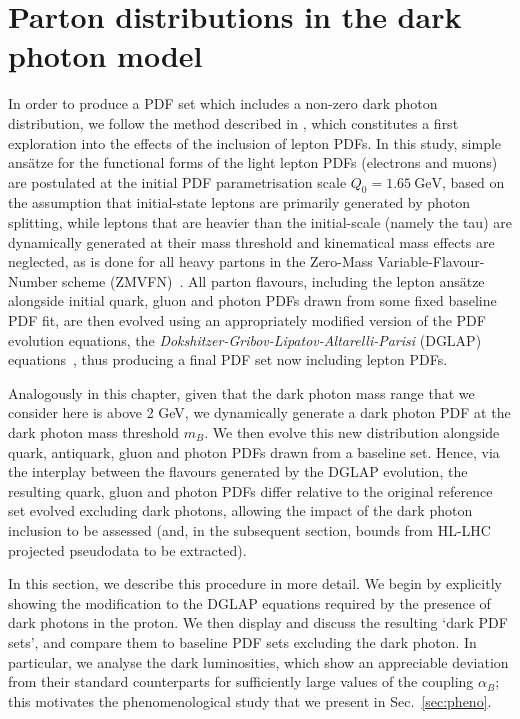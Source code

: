 \documentclass[withindex,glossary]{cam-thesis}
\begin{document}
\section{Parton distributions in the dark photon model}
\label{sec:dark_pdfs}
In order to produce a PDF set which includes a non-zero dark photon distribution,
we follow the method described in \cite{Bertone:2015lqa},
which constitutes a first exploration into the effects of the inclusion of lepton PDFs.
In this study, 
simple ans\"{a}tze for the functional forms of the light lepton PDFs (electrons and muons)
are postulated at the initial PDF parametrisation scale $Q_0 = 1.65\ \text{GeV}$, based on the assumption that
initial-state leptons are primarily generated by photon splitting, 
while leptons that are heavier than the initial-scale (namely the
tau) are dynamically generated at their mass threshold and
kinematical mass effects are neglected, as is done for all heavy
partons in the Zero-Mass Variable-Flavour-Number scheme (ZMVFN)~\cite{Maltoni:2012pa,Bertone:2017djs}.  
%
All parton flavours, including the lepton ans\"{a}tze alongside initial quark,
gluon and photon PDFs drawn from some fixed baseline PDF fit, are then
evolved using an appropriately modified version of the PDF evolution equations,
the \textit{Dokshitzer-Gribov-Lipatov-Altarelli-Parisi} (DGLAP)
equations~\cite{Altarelli:1977zs,Gribov:1972ri,Dokshitzer:1977sg}, thus producing
a final PDF set now including lepton PDFs. 

Analogously in this chapter, given that the dark photon mass range that
we consider here is above 2 GeV,
we dynamically generate a dark photon PDF at the dark photon mass threshold $m_B$. 
We then evolve this new distribution alongside quark, antiquark,
gluon and photon PDFs drawn from a baseline set.
Hence, via the interplay between the flavours generated by
the DGLAP evolution, the resulting quark, gluon and photon PDFs differ relative
to the original reference set evolved excluding dark photons, allowing the impact
of the dark photon inclusion to be assessed (and, in the subsequent section, bounds from HL-LHC
projected pseudodata to be extracted).

In this section, we describe this procedure in more detail.
We begin by explicitly showing the modification to the DGLAP equations
required by the presence of dark photons in the proton.
We then display and discuss the resulting `dark PDF sets',
and compare them to baseline PDF sets excluding the dark photon.
In particular, we analyse the dark luminosities, which show an appreciable deviation
from their standard counterparts for sufficiently large values of the coupling $\alpha_B$;
this motivates the phenomenological study that we present in Sec.~\ref{sec:pheno}.
\end{document}
